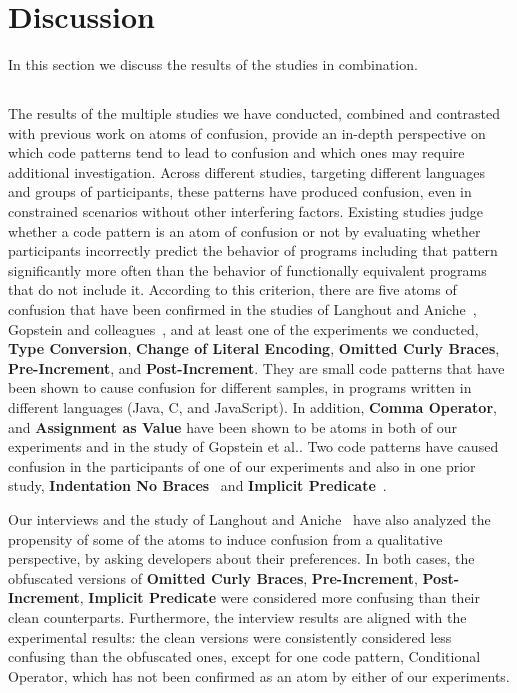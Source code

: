 \section{Discussion}
\label{sec:discussion}

In this section we discuss the results of the studies in combination. 

\subsection{}\label{sec:contrast}

The results of the multiple studies we have conducted, combined and contrasted with previous work on atoms of confusion, provide an in-depth perspective on which code patterns tend to lead to confusion and which ones may require additional investigation. Across different studies, targeting different languages and groups of participants, these patterns have produced confusion, even in constrained scenarios without other interfering factors. 
Existing studies judge whether a code pattern is an atom of confusion or not by evaluating whether participants incorrectly predict the behavior of programs including that pattern significantly more often than the behavior of functionally equivalent programs that do not include it. According to this criterion, there are five atoms of confusion that have been confirmed in the studies of Langhout and Aniche~\cite{Langhout:2021:ACJ}, Gopstein and colleagues~\cite{DBLP:conf/sigsoft/GopsteinIYDZYC17}, and at least one of the experiments we conducted, \textbf{Type Conversion}, \textbf{Change of Literal Encoding}, \textbf{Omitted Curly Braces}, \textbf{Pre-Increment}, and \textbf{Post-Increment}. They are small code patterns that have been shown to cause confusion for different samples, in programs written in different languages (Java, C, and JavaScript). In addition, \textbf{Comma Operator}, and \textbf{Assignment as Value} have been shown to be atoms in both of our experiments and in the study of Gopstein et al.\cite{DBLP:conf/sigsoft/GopsteinIYDZYC17}. 
Two code patterns have caused confusion in the participants of one of our experiments and also in one prior study, \textbf{Indentation No Braces}~\cite{Langhout:2021:ACJ} and \textbf{Implicit Predicate}~\cite{DBLP:conf/sigsoft/GopsteinIYDZYC17}. 
   
Our interviews and the study of Langhout and Aniche~\cite{Langhout:2021:ACJ} have also analyzed the propensity of some of the atoms to induce confusion from a qualitative perspective, by asking developers about their preferences. In both cases, the obfuscated versions of \textbf{Omitted Curly Braces}, \textbf{Pre-Increment}, \textbf{Post-Increment}, \textbf{Implicit Predicate} were considered more confusing than their clean counterparts. Furthermore, the interview results are aligned with the experimental results: the clean versions were consistently considered less confusing than the obfuscated ones, except for one code pattern, Conditional Operator, which has not been confirmed as an atom by either of our experiments. 

